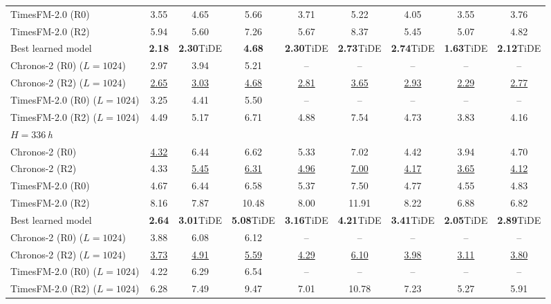 \begin{table}[!t]
\begin{adjustbox}{max width=\linewidth}
\begin{tabular}{lcccccccc}
TimesFM-2.0 (R0) & 3.55 & 4.65 & 5.66 & 3.71 & 5.22 & 4.05 & 3.55 & 3.76 \\
TimesFM-2.0 (R2) & 5.94 & 5.60 & 7.26 & 5.67 & 8.37 & 5.45 & 5.07 & 4.82 \\
Best learned model & \textbf{2.18}{\scriptsize\color{gray}{PLANET}} & \textbf{2.30}{\scriptsize\color{gray}TiDE} & \textbf{4.68}{\scriptsize\color{gray}{PLANET}} & \textbf{2.30}{\scriptsize\color{gray}TiDE} & \textbf{2.73}{\scriptsize\color{gray}TiDE} & \textbf{2.74}{\scriptsize\color{gray}TiDE} & \textbf{1.63}{\scriptsize\color{gray}TiDE} & \textbf{2.12}{\scriptsize\color{gray}TiDE} \\
\cmidrule(lr){1-9}
Chronos-2 (R0) ($L{=}1024$) & 2.97 & 3.94 & 5.21 & -- & -- & -- & -- & -- \\
Chronos-2 (R2) ($L{=}1024$) & \underline{2.65} & \underline{3.03} & \underline{4.68} & \underline{2.81} & \underline{3.65} & \underline{2.93} & \underline{2.29} & \underline{2.77} \\
TimesFM-2.0 (R0) ($L{=}1024$) & 3.25 & 4.41 & 5.50 & -- & -- & -- & -- & -- \\
TimesFM-2.0 (R2) ($L{=}1024$) & 4.49 & 5.17 & 6.71 & 4.88 & 7.54 & 4.73 & 3.83 & 4.16 \\
\midrule
\multicolumn{9}{l}{\textit{$H=336$\,h}} \\
Chronos-2 (R0) & \underline{4.32} & 6.44 & 6.62 & 5.33 & 7.02 & 4.42 & 3.94 & 4.70 \\
Chronos-2 (R2) & 4.33 & \underline{5.45} & \underline{6.31} & \underline{4.96} & \underline{7.00} & \underline{4.17} & \underline{3.65} & \underline{4.12} \\
TimesFM-2.0 (R0) & 4.67 & 6.44 & 6.58 & 5.37 & 7.50 & 4.77 & 4.55 & 4.83 \\
TimesFM-2.0 (R2) & 8.16 & 7.87 & 10.48 & 8.00 & 11.91 & 8.22 & 6.88 & 6.82 \\
Best learned model & \textbf{2.64}{\scriptsize\color{gray}{PLANET}} & \textbf{3.01}{\scriptsize\color{gray}TiDE} & \textbf{5.08}{\scriptsize\color{gray}TiDE} & \textbf{3.16}{\scriptsize\color{gray}TiDE} & \textbf{4.21}{\scriptsize\color{gray}TiDE} & \textbf{3.41}{\scriptsize\color{gray}TiDE} & \textbf{2.05}{\scriptsize\color{gray}TiDE} & \textbf{2.89}{\scriptsize\color{gray}TiDE} \\
\cmidrule(lr){1-9}
Chronos-2 (R0) ($L{=}1024$) & 3.88 & 6.08 & 6.12 & -- & -- & -- & -- & -- \\
Chronos-2 (R2) ($L{=}1024$) & \underline{3.73} & \underline{4.91} & \underline{5.59} & \underline{4.29} & \underline{6.10} & \underline{3.98} & \underline{3.11} & \underline{3.80} \\
TimesFM-2.0 (R0) ($L{=}1024$) & 4.22 & 6.29 & 6.54 & -- & -- & -- & -- & -- \\
TimesFM-2.0 (R2) ($L{=}1024$) & 6.28 & 7.49 & 9.47 & 7.01 & 10.78 & 7.23 & 5.27 & 5.91 \\
\bottomrule
\end{tabular}
\end{adjustbox}
\end{table}
